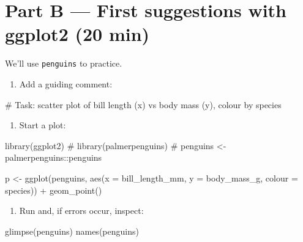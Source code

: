 \documentclass[
  letterpaper,
  DIV=11,
  numbers=noendperiod]{scrreprt}
\newenvironment{Shaded}{\begin{snugshade}}{\end{snugshade}}
\newcommand{\AttributeTok}[1]{\textcolor[rgb]{0.40,0.45,0.13}{#1}}
\newcommand{\CommentTok}[1]{\textcolor[rgb]{0.37,0.37,0.37}{#1}}
\newcommand{\FunctionTok}[1]{\textcolor[rgb]{0.28,0.35,0.67}{#1}}
\newcommand{\NormalTok}[1]{\textcolor[rgb]{0.00,0.23,0.31}{#1}}
\newcommand{\OtherTok}[1]{\textcolor[rgb]{0.00,0.23,0.31}{#1}}
\newcommand{\SpecialCharTok}[1]{\textcolor[rgb]{0.37,0.37,0.37}{#1}}
\providecommand{\tightlist}{%
  \setlength{\itemsep}{0pt}\setlength{\parskip}{0pt}}
\begin{document}
\section{Part B --- First suggestions with ggplot2 (20
min)}\label{part-b-first-suggestions-with-ggplot2-20-min}

We'll use \texttt{penguins} to practice.

\begin{enumerate}
\def\labelenumi{\arabic{enumi}.}
\tightlist
\item
  Add a guiding comment:
\end{enumerate}

\begin{Shaded}
\begin{Highlighting}[]
\CommentTok{\# Task: scatter plot of bill length (x) vs body mass (y), colour by species}
\end{Highlighting}
\end{Shaded}

\begin{enumerate}
\def\labelenumi{\arabic{enumi}.}
\setcounter{enumi}{1}
\tightlist
\item
  Start a plot:
\end{enumerate}

\begin{Shaded}
\begin{Highlighting}[]
\FunctionTok{library}\NormalTok{(ggplot2)}
\CommentTok{\# library(palmerpenguins)}
\CommentTok{\# penguins \textless{}{-} palmerpenguins::penguins}

\NormalTok{p }\OtherTok{\textless{}{-}} \FunctionTok{ggplot}\NormalTok{(penguins, }\FunctionTok{aes}\NormalTok{(}\AttributeTok{x =}\NormalTok{ bill\_length\_mm, }\AttributeTok{y =}\NormalTok{ body\_mass\_g, }\AttributeTok{colour =}\NormalTok{ species)) }\SpecialCharTok{+}
  \FunctionTok{geom\_point}\NormalTok{()}
\end{Highlighting}
\end{Shaded}

\begin{enumerate}
\def\labelenumi{\arabic{enumi}.}
\setcounter{enumi}{2}
\tightlist
\item
  Run and, if errors occur, inspect:
\end{enumerate}

\begin{Shaded}
\begin{Highlighting}[]
\FunctionTok{glimpse}\NormalTok{(penguins)}
\FunctionTok{names}\NormalTok{(penguins)}
\end{Highlighting}
\end{Shaded}
\end{document}
